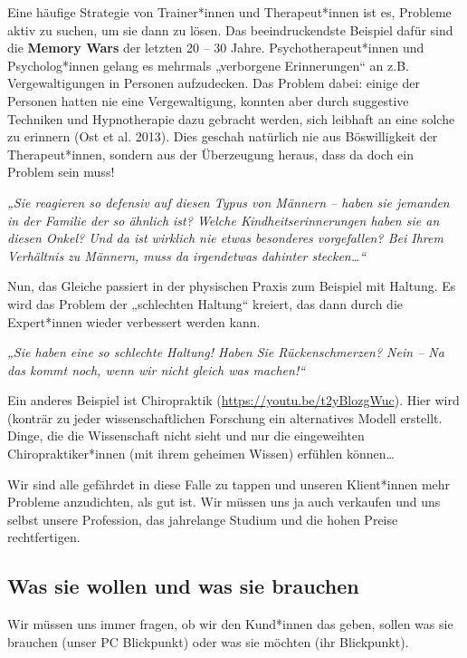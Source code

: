 \documentclass[
  letterpaper,
  DIV=11,
  numbers=noendperiod]{scrreprt}
\begin{document}
Eine häufige Strategie von Trainer*innen und Therapeut*innen ist es,
Probleme aktiv zu suchen, um sie dann zu lösen. Das beeindruckendste
Beispiel dafür sind die \textbf{Memory Wars} der letzten 20 -- 30 Jahre.
Psychotherapeut*innen und Psycholog*innen gelang es mehrmals „verborgene
Erinnerungen`` an z.B. Vergewaltigungen in Personen aufzudecken. Das
Problem dabei: einige der Personen hatten nie eine Vergewaltigung,
konnten aber durch suggestive Techniken und Hypnotherapie dazu gebracht
werden, sich leibhaft an eine solche zu erinnern (Ost et al. 2013). Dies
geschah natürlich nie aus Böswilligkeit der Therapeut*innen, sondern aus
der Überzeugung heraus, dass da doch ein Problem sein muss!

\emph{„Sie reagieren so defensiv auf diesen Typus von Männern -- haben
sie jemanden in der Familie der so ähnlich ist? Welche
Kindheitserinnerungen haben sie an diesen Onkel? Und da ist wirklich nie
etwas besonderes vorgefallen? Bei Ihrem Verhältnis zu Männern, muss da
irgendetwas dahinter stecken\ldots``}

Nun, das Gleiche passiert in der physischen Praxis zum Beispiel mit
Haltung. Es wird das Problem der „schlechten Haltung`` kreiert, das dann
durch die Expert*innen wieder verbessert werden kann.

\emph{„Sie haben eine so schlechte Haltung! Haben Sie Rückenschmerzen?
Nein -- Na das kommt noch, wenn wir nicht gleich was machen!{}``}

Ein anderes Beispiel ist Chiropraktik
(\url{https://youtu.be/t2yBlozgWuc}). Hier wird (konträr zu jeder
wissenschaftlichen Forschung ein alternatives Modell erstellt. Dinge,
die die Wissenschaft nicht sieht und nur die eingeweihten
Chiropraktiker*innen (mit ihrem geheimen Wissen) erfühlen können\ldots{}

Wir sind alle gefährdet in diese Falle zu tappen und unseren
Klient*innen mehr Probleme anzudichten, als gut ist. Wir müssen uns ja
auch verkaufen und uns selbst unsere Profession, das jahrelange Studium
und die hohen Preise rechtfertigen.

\subsection{Was sie wollen und was sie
brauchen}\label{was-sie-wollen-und-was-sie-brauchen}

Wir müssen uns immer fragen, ob wir den Kund*innen das geben, sollen was
sie brauchen (unser PC Blickpunkt) oder was sie möchten (ihr
Blickpunkt).
\end{document}
